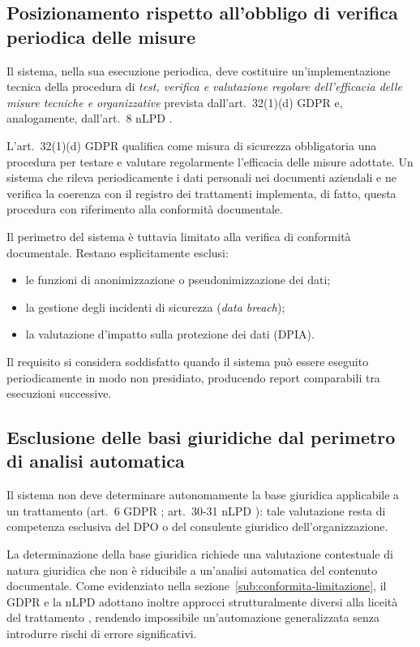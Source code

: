 \subsection{Posizionamento rispetto all'obbligo di verifica periodica delle misure}
\label{sec:posizionamento-art32}
Il sistema, nella sua esecuzione periodica, deve costituire un'implementazione tecnica della procedura di \textit{test, verifica e valutazione regolare dell'efficacia delle misure tecniche e organizzative} prevista dall'art.~32(1)(d) GDPR \cite{RegolamentoUE20162016} e, analogamente, dall'art.~8 nLPD \cite{RS2351Legge}. \medskip

L'art.~32(1)(d) GDPR \cite{RegolamentoUE20162016} qualifica come misura di sicurezza obbligatoria una procedura per testare e valutare regolarmente l'efficacia delle misure adottate. Un sistema che rileva periodicamente i dati personali nei documenti aziendali e ne verifica la coerenza con il registro dei trattamenti implementa, di fatto, questa procedura con riferimento alla conformità documentale. \medskip

Il perimetro del sistema è tuttavia limitato alla verifica di conformità documentale. Restano esplicitamente esclusi:
\begin{itemize}
	\item le funzioni di anonimizzazione o pseudonimizzazione dei dati;
	\item la gestione degli incidenti di sicurezza (\textit{data breach});
	\item la valutazione d'impatto sulla protezione dei dati (DPIA).
\end{itemize} \medskip

Il requisito si considera soddisfatto quando il sistema può essere eseguito periodicamente in modo non presidiato, producendo report comparabili tra esecuzioni successive.

\subsection{Esclusione delle basi giuridiche dal perimetro di analisi automatica}
\label{sub:esclusione-basi-giuridiche}
Il sistema non deve determinare autonomamente la base giuridica applicabile a un trattamento (art.~6 GDPR \cite{RegolamentoUE20162016}; art.~30-31 nLPD \cite{RS2351Legge}): tale valutazione resta di competenza esclusiva del DPO o del consulente giuridico dell'organizzazione. \medskip

La determinazione della base giuridica richiede una valutazione contestuale di natura giuridica che non è riducibile a un'analisi automatica del contenuto documentale. Come evidenziato nella sezione~\ref{sub:conformita-limitazione}, il GDPR e la nLPD adottano inoltre approcci strutturalmente diversi alla liceità del trattamento \cite{RegolamentoUE20162016, RS2351Legge}, rendendo impossibile un'automazione generalizzata senza introdurre rischi di errore significativi. \medskip

